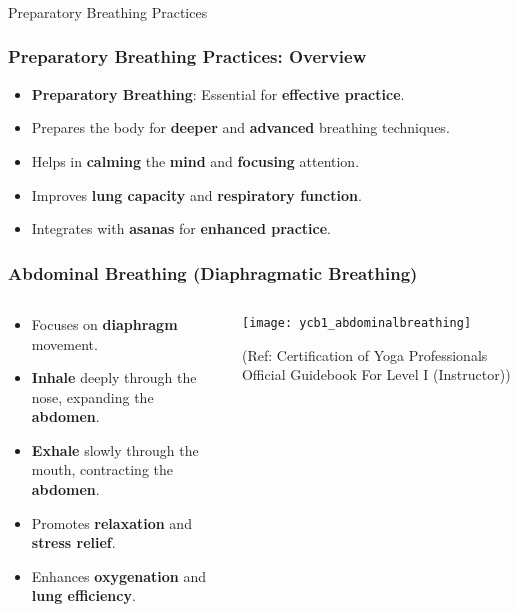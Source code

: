 


\begin{frame}[fragile]\frametitle{}
\begin{center}
{\Large Preparatory Breathing Practices }
\end{center}
\end{frame}

\begin{frame}[fragile]\frametitle{Preparatory Breathing Practices: Overview}
      \begin{itemize}
        \item \textbf{Preparatory Breathing}: Essential for \textbf{effective practice}.
        \item Prepares the body for \textbf{deeper} and \textbf{advanced} breathing techniques.
        \item Helps in \textbf{calming} the \textbf{mind} and \textbf{focusing} attention.
        \item Improves \textbf{lung capacity} and \textbf{respiratory function}.
        \item Integrates with \textbf{asanas} for \textbf{enhanced practice}.
      \end{itemize}

\end{frame}

\begin{frame}[fragile]\frametitle{Abdominal Breathing (Diaphragmatic Breathing)}
\begin{columns}
    \begin{column}[T]{0.5\linewidth}
      \begin{itemize}
        \item Focuses on \textbf{diaphragm} movement.
        \item \textbf{Inhale} deeply through the nose, expanding the \textbf{abdomen}.
        \item \textbf{Exhale} slowly through the mouth, contracting the \textbf{abdomen}.
        \item Promotes \textbf{relaxation} and \textbf{stress relief}.
        \item Enhances \textbf{oxygenation} and \textbf{lung efficiency}.
      \end{itemize}
    \end{column}
    \begin{column}[T]{0.5\linewidth}
        \begin{center}
        \texttt{[image: ycb1\_abdominalbreathing]}
				
		{\tiny (Ref: Certification  of Yoga Professionals Official Guidebook For Level I (Instructor))}	  		
        \end{center}	
    \end{column}
\end{columns}
\end{frame}

